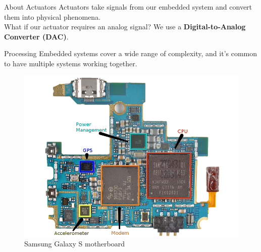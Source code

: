\documentclass{beamer}
\begin{document}
\begin{frame}{About Actuators}
Actuators take signals from our embedded system and convert them into physical phenomena. \\
\vspace{5em}
What if our actuator requires an analog signal? We use a {\bf Digital-to-Analog Converter (DAC)}.
\end{frame}  
  
\begin{frame}[t]{Processing}
\small
Embedded systems cover a wide range of complexity, and it's common to have multiple systems working together. \\
\vspace{1em}
\begin{figure}
\includegraphics[width=\textwidth,height=0.6\textheight,keepaspectratio,left]{img/Galaxy_Logic_Board_Edited_2_small_annotated.png}
\captionsetup{justification=raggedright,singlelinecheck=false,labelformat=empty}
\caption{Samsung Galaxy S motherboard}
\end{figure}
\end{frame}  
\end{document}

